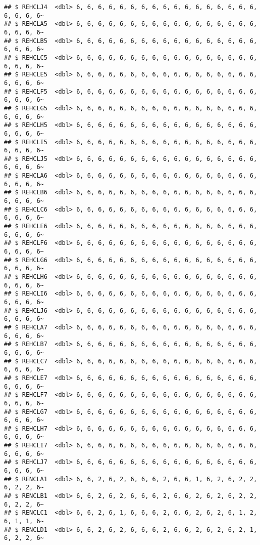 \documentclass[
]{article}
\begin{document}
\begin{verbatim}
## $ REHCLJ4  <dbl> 6, 6, 6, 6, 6, 6, 6, 6, 6, 6, 6, 6, 6, 6, 6, 6, 6, 6, 6, 6, 6~
## $ REHCLA5  <dbl> 6, 6, 6, 6, 6, 6, 6, 6, 6, 6, 6, 6, 6, 6, 6, 6, 6, 6, 6, 6, 6~
## $ REHCLB5  <dbl> 6, 6, 6, 6, 6, 6, 6, 6, 6, 6, 6, 6, 6, 6, 6, 6, 6, 6, 6, 6, 6~
## $ REHCLC5  <dbl> 6, 6, 6, 6, 6, 6, 6, 6, 6, 6, 6, 6, 6, 6, 6, 6, 6, 6, 6, 6, 6~
## $ REHCLE5  <dbl> 6, 6, 6, 6, 6, 6, 6, 6, 6, 6, 6, 6, 6, 6, 6, 6, 6, 6, 6, 6, 6~
## $ REHCLF5  <dbl> 6, 6, 6, 6, 6, 6, 6, 6, 6, 6, 6, 6, 6, 6, 6, 6, 6, 6, 6, 6, 6~
## $ REHCLG5  <dbl> 6, 6, 6, 6, 6, 6, 6, 6, 6, 6, 6, 6, 6, 6, 6, 6, 6, 6, 6, 6, 6~
## $ REHCLH5  <dbl> 6, 6, 6, 6, 6, 6, 6, 6, 6, 6, 6, 6, 6, 6, 6, 6, 6, 6, 6, 6, 6~
## $ REHCLI5  <dbl> 6, 6, 6, 6, 6, 6, 6, 6, 6, 6, 6, 6, 6, 6, 6, 6, 6, 6, 6, 6, 6~
## $ REHCLJ5  <dbl> 6, 6, 6, 6, 6, 6, 6, 6, 6, 6, 6, 6, 6, 6, 6, 6, 6, 6, 6, 6, 6~
## $ REHCLA6  <dbl> 6, 6, 6, 6, 6, 6, 6, 6, 6, 6, 6, 6, 6, 6, 6, 6, 6, 6, 6, 6, 6~
## $ REHCLB6  <dbl> 6, 6, 6, 6, 6, 6, 6, 6, 6, 6, 6, 6, 6, 6, 6, 6, 6, 6, 6, 6, 6~
## $ REHCLC6  <dbl> 6, 6, 6, 6, 6, 6, 6, 6, 6, 6, 6, 6, 6, 6, 6, 6, 6, 6, 6, 6, 6~
## $ REHCLE6  <dbl> 6, 6, 6, 6, 6, 6, 6, 6, 6, 6, 6, 6, 6, 6, 6, 6, 6, 6, 6, 6, 6~
## $ REHCLF6  <dbl> 6, 6, 6, 6, 6, 6, 6, 6, 6, 6, 6, 6, 6, 6, 6, 6, 6, 6, 6, 6, 6~
## $ REHCLG6  <dbl> 6, 6, 6, 6, 6, 6, 6, 6, 6, 6, 6, 6, 6, 6, 6, 6, 6, 6, 6, 6, 6~
## $ REHCLH6  <dbl> 6, 6, 6, 6, 6, 6, 6, 6, 6, 6, 6, 6, 6, 6, 6, 6, 6, 6, 6, 6, 6~
## $ REHCLI6  <dbl> 6, 6, 6, 6, 6, 6, 6, 6, 6, 6, 6, 6, 6, 6, 6, 6, 6, 6, 6, 6, 6~
## $ REHCLJ6  <dbl> 6, 6, 6, 6, 6, 6, 6, 6, 6, 6, 6, 6, 6, 6, 6, 6, 6, 6, 6, 6, 6~
## $ REHCLA7  <dbl> 6, 6, 6, 6, 6, 6, 6, 6, 6, 6, 6, 6, 6, 6, 6, 6, 6, 6, 6, 6, 6~
## $ REHCLB7  <dbl> 6, 6, 6, 6, 6, 6, 6, 6, 6, 6, 6, 6, 6, 6, 6, 6, 6, 6, 6, 6, 6~
## $ REHCLC7  <dbl> 6, 6, 6, 6, 6, 6, 6, 6, 6, 6, 6, 6, 6, 6, 6, 6, 6, 6, 6, 6, 6~
## $ REHCLE7  <dbl> 6, 6, 6, 6, 6, 6, 6, 6, 6, 6, 6, 6, 6, 6, 6, 6, 6, 6, 6, 6, 6~
## $ REHCLF7  <dbl> 6, 6, 6, 6, 6, 6, 6, 6, 6, 6, 6, 6, 6, 6, 6, 6, 6, 6, 6, 6, 6~
## $ REHCLG7  <dbl> 6, 6, 6, 6, 6, 6, 6, 6, 6, 6, 6, 6, 6, 6, 6, 6, 6, 6, 6, 6, 6~
## $ REHCLH7  <dbl> 6, 6, 6, 6, 6, 6, 6, 6, 6, 6, 6, 6, 6, 6, 6, 6, 6, 6, 6, 6, 6~
## $ REHCLI7  <dbl> 6, 6, 6, 6, 6, 6, 6, 6, 6, 6, 6, 6, 6, 6, 6, 6, 6, 6, 6, 6, 6~
## $ REHCLJ7  <dbl> 6, 6, 6, 6, 6, 6, 6, 6, 6, 6, 6, 6, 6, 6, 6, 6, 6, 6, 6, 6, 6~
## $ RENCLA1  <dbl> 6, 6, 2, 6, 2, 6, 6, 6, 2, 6, 6, 1, 6, 2, 6, 2, 2, 6, 2, 2, 6~
## $ RENCLB1  <dbl> 6, 6, 2, 6, 2, 6, 6, 6, 2, 6, 6, 2, 6, 2, 6, 2, 2, 6, 2, 2, 6~
## $ RENCLC1  <dbl> 6, 6, 2, 6, 1, 6, 6, 6, 2, 6, 6, 2, 6, 2, 6, 1, 2, 6, 1, 1, 6~
## $ RENCLD1  <dbl> 6, 6, 2, 6, 2, 6, 6, 6, 2, 6, 6, 2, 6, 2, 6, 2, 1, 6, 2, 2, 6~

\end{verbatim}
\end{document}
